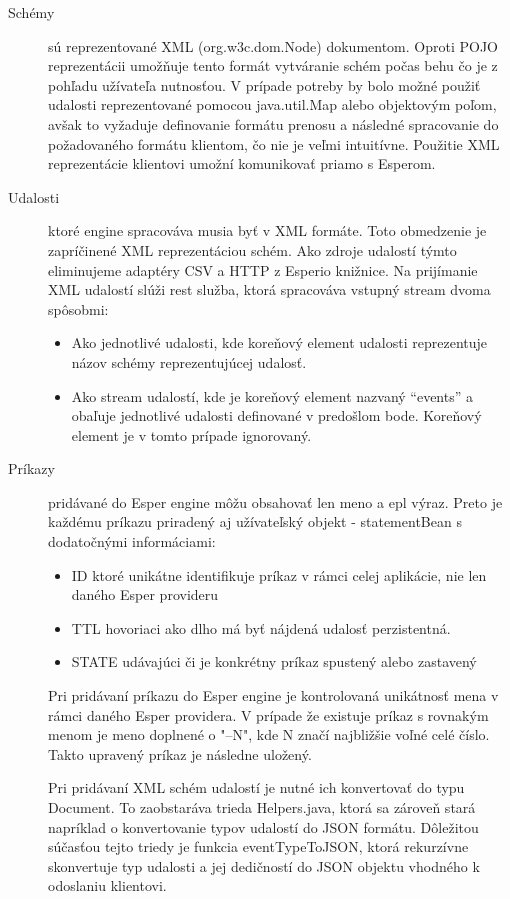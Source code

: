 		\begin{description}
			\item[Schémy] sú reprezentované XML (org.w3c.dom.Node) dokumentom. Oproti POJO reprezentácii umožňuje tento formát vytváranie schém počas behu čo je z pohľadu užívateľa nutnosťou. V prípade potreby by bolo možné použiť udalosti reprezentované pomocou java.util.Map alebo objektovým poľom, avšak to vyžaduje definovanie formátu prenosu a následné spracovanie do požadovaného formátu klientom, čo nie je veľmi intuitívne. Použitie XML reprezentácie klientovi umožní komunikovať priamo s Esperom.
			
			\item[Udalosti] ktoré engine spracováva musia byť v XML formáte. Toto obmedzenie je zapríčinené XML reprezentáciou schém. Ako zdroje udalostí týmto eliminujeme adaptéry CSV a HTTP z Esperio knižnice. Na prijímanie XML udalostí slúži rest služba, ktorá spracováva vstupný stream dvoma spôsobmi:
			\begin{itemize}
				\item Ako jednotlivé udalosti, kde koreňový element udalosti reprezentuje názov schémy reprezentujúcej udalosť.
				\item Ako stream udalostí, kde je koreňový element nazvaný ``events'' a obaľuje jednotlivé udalosti definované v predošlom bode. Koreňový element je v tomto prípade ignorovaný.
			\end{itemize}
			
			\item[Príkazy] pridávané do Esper engine môžu obsahovať len meno a epl výraz. Preto je každému príkazu priradený aj užívateľský objekt - statementBean s dodatočnými informáciami:
			\begin{itemize}
				\item ID ktoré unikátne identifikuje príkaz v rámci celej aplikácie, nie len daného Esper provideru
				\item TTL hovoriaci ako dlho má byť nájdená udalosť perzistentná.
				\item STATE udávajúci či je konkrétny príkaz spustený alebo zastavený
			\end{itemize}
				

			Pri pridávaní príkazu do Esper engine je kontrolovaná unikátnosť mena v rámci daného Esper providera. V prípade že existuje príkaz s rovnakým menom je meno doplnené o "--N", kde N značí najbližšie voľné celé číslo. Takto upravený príkaz je následne uložený.
			
			Pri pridávaní XML schém udalostí je nutné ich konvertovať do typu Document. To zaobstaráva trieda Helpers.java, ktorá sa zároveň stará napríklad o konvertovanie typov udalostí do JSON formátu. Dôležitou súčasťou tejto triedy je funkcia eventTypeToJSON, ktorá rekurzívne skonvertuje typ udalosti a jej dedičností do JSON objektu vhodného k odoslaniu klientovi.
			
		\end{description}
		
